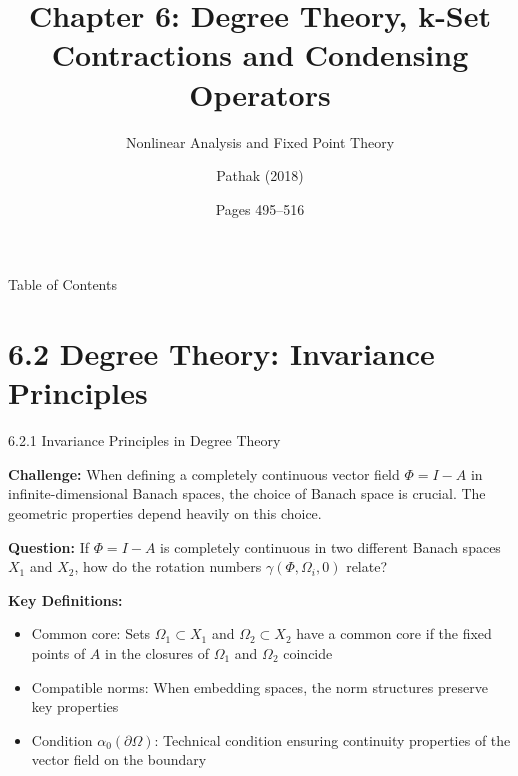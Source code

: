\documentclass[aspectratio=169,10pt]{beamer}
\title{Chapter 6: Degree Theory, k-Set Contractions and Condensing Operators}
\subtitle{Nonlinear Analysis and Fixed Point Theory}
\author{Pathak (2018)}
\date{Pages 495--516}
\begin{document}
\frame{\titlepage}

\begin{frame}{Table of Contents}
  \tableofcontents
\end{frame}

\section{6.2 Degree Theory: Invariance Principles}

\begin{frame}{6.2.1 Invariance Principles in Degree Theory}

\textbf{Challenge:} When defining a completely continuous vector field $\Phi = I - A$ in infinite-dimensional Banach spaces, the choice of Banach space is crucial. The geometric properties depend heavily on this choice.

\vspace{0.5cm}

\textbf{Question:} If $\Phi = I - A$ is completely continuous in two different Banach spaces $X_1$ and $X_2$, how do the rotation numbers $\gamma(\Phi, \Omega_i, 0)$ relate?

\vspace{0.5cm}

\textbf{Key Definitions:}
\begin{itemize}
    \item \alert{Common core}: Sets $\Omega_1 \subset X_1$ and $\Omega_2 \subset X_2$ have a common core if the fixed points of $A$ in the closures of $\Omega_1$ and $\Omega_2$ coincide
    \item \alert{Compatible norms}: When embedding spaces, the norm structures preserve key properties
    \item \alert{Condition $\alpha_0(\partial\Omega)$}: Technical condition ensuring continuity properties of the vector field on the boundary
\end{itemize}

\end{frame}
\end{document}
